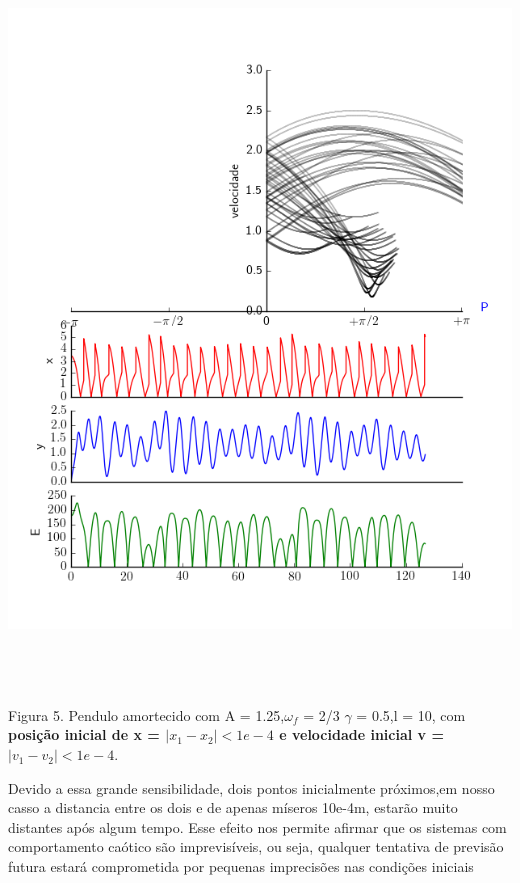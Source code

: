 \documentclass[dvipsnames,a4paper,11pt]{article}
\begin{document}
\begin{center}
	\includegraphics[width=6.24in,height=7.68in,keepaspectratio = false]{imageA.png}
	
	\scriptsize Figura 5. Pendulo amortecido com A = 1.25,$\omega_f$ = 2/3 $\gamma$ = 0.5,l = 10, com \textbf{posição inicial de x = $|x_1 - x_2| <1e-4$ e velocidade inicial v = $|v_1 - v_2| <1e-4$}. 
	
\end{center}

Devido a essa grande sensibilidade, dois pontos inicialmente próximos,em nosso casso a distancia entre os dois e de apenas míseros 10e-4m, estarão muito distantes após algum tempo. Esse efeito nos permite afirmar que os sistemas com comportamento caótico são imprevisíveis, ou seja, qualquer tentativa de previsão futura estará comprometida por pequenas imprecisões nas condições iniciais
\end{document}
